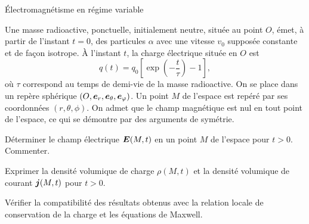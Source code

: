 \begin{td}{Électromagnétisme en régime variable}

	Une masse radioactive, ponctuelle, initialement neutre, située au point $O$,
	émet, à partir de l'instant $t = 0$, des particules $\alpha$ avec une vitesse
	$v_0$ supposée constante et de façon isotrope. À l'instant $t$, la charge 
	électrique située en $O$ est
	\begin{equation*}
		q(t) = q_0 \left[\exp\left(-\dfrac{t}{\tau}\right) - 1\right],
	\end{equation*}
	où $\tau$ correspond au temps de demi-vie de la masse radioactive. 
	On se place dans un repère sphérique $(O, \er, \etheta, \ephi)$. Un point
	$M$ de l'espace est repéré par ses coordonnées $(r, \theta, \phi)$. 
	On admet que le champ magnétique est nul en tout point de 
	l'espace, ce qui se démontre par des arguments de symétrie. 
	\begin{exlist}
		\item Déterminer le champ électrique $\vece(M, t)$ 
		  en un point $M$ de l'espace pour $t > 0$.
		  Commenter.
		\item Exprimer la densité volumique de charge $\rho(M, t)$ et la
		  densité volumique de courant $\vecj(M, t)$ pour $t > 0$.
		\item Vérifier la compatibilité des résultats obtenus avec la 
		  relation locale de conservation de la charge et les équations de 
		  Maxwell.
	\end{exlist}



\end{td}
